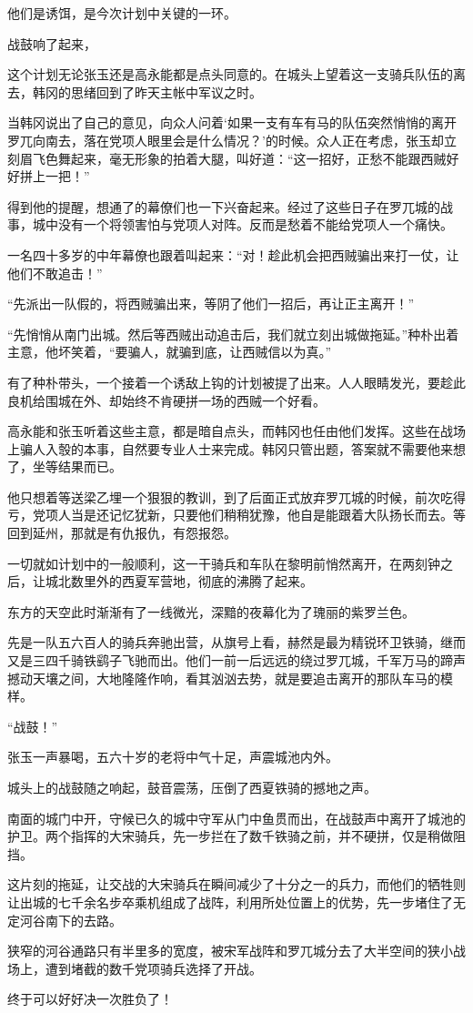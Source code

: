 他们是诱饵，是今次计划中关键的一环。

战鼓响了起来，

这个计划无论张玉还是高永能都是点头同意的。在城头上望着这一支骑兵队伍的离去，韩冈的思绪回到了昨天主帐中军议之时。

当韩冈说出了自己的意见，向众人问着‘如果一支有车有马的队伍突然悄悄的离开罗兀向南去，落在党项人眼里会是什么情况？’的时候。众人正在考虑，张玉却立刻眉飞色舞起来，毫无形象的拍着大腿，叫好道：“这一招好，正愁不能跟西贼好好拼上一把！”

得到他的提醒，想通了的幕僚们也一下兴奋起来。经过了这些日子在罗兀城的战事，城中没有一个将领害怕与党项人对阵。反而是愁着不能给党项人一个痛快。

一名四十多岁的中年幕僚也跟着叫起来：“对！趁此机会把西贼骗出来打一仗，让他们不敢追击！”

“先派出一队假的，将西贼骗出来，等阴了他们一招后，再让正主离开！”

“先悄悄从南门出城。然后等西贼出动追击后，我们就立刻出城做拖延。”种朴出着主意，他坏笑着，“要骗人，就骗到底，让西贼信以为真。”

有了种朴带头，一个接着一个诱敌上钩的计划被提了出来。人人眼睛发光，要趁此良机给围城在外、却始终不肯硬拼一场的西贼一个好看。

高永能和张玉听着这些主意，都是暗自点头，而韩冈也任由他们发挥。这些在战场上骗人入彀的本事，自然要专业人士来完成。韩冈只管出题，答案就不需要他来想了，坐等结果而已。

他只想着等送梁乙埋一个狠狠的教训，到了后面正式放弃罗兀城的时候，前次吃得亏，党项人当是还记忆犹新，只要他们稍稍犹豫，他自是能跟着大队扬长而去。等回到延州，那就是有仇报仇，有怨报怨。

一切就如计划中的一般顺利，这一干骑兵和车队在黎明前悄然离开，在两刻钟之后，让城北数里外的西夏军营地，彻底的沸腾了起来。

东方的天空此时渐渐有了一线微光，深黯的夜幕化为了瑰丽的紫罗兰色。

先是一队五六百人的骑兵奔驰出营，从旗号上看，赫然是最为精锐环卫铁骑，继而又是三四千骑铁鹞子飞驰而出。他们一前一后远远的绕过罗兀城，千军万马的蹄声撼动天壤之间，大地隆隆作响，看其汹汹去势，就是要追击离开的那队车马的模样。

“战鼓！”

张玉一声暴喝，五六十岁的老将中气十足，声震城池内外。

城头上的战鼓随之响起，鼓音震荡，压倒了西夏铁骑的撼地之声。

南面的城门中开，守候已久的城中守军从门中鱼贯而出，在战鼓声中离开了城池的护卫。两个指挥的大宋骑兵，先一步拦在了数千铁骑之前，并不硬拼，仅是稍做阻挡。

这片刻的拖延，让交战的大宋骑兵在瞬间减少了十分之一的兵力，而他们的牺牲则让出城的七千余名步卒乘机组成了战阵，利用所处位置上的优势，先一步堵住了无定河谷南下的去路。

狭窄的河谷通路只有半里多的宽度，被宋军战阵和罗兀城分去了大半空间的狭小战场上，遭到堵截的数千党项骑兵选择了开战。

终于可以好好决一次胜负了！

